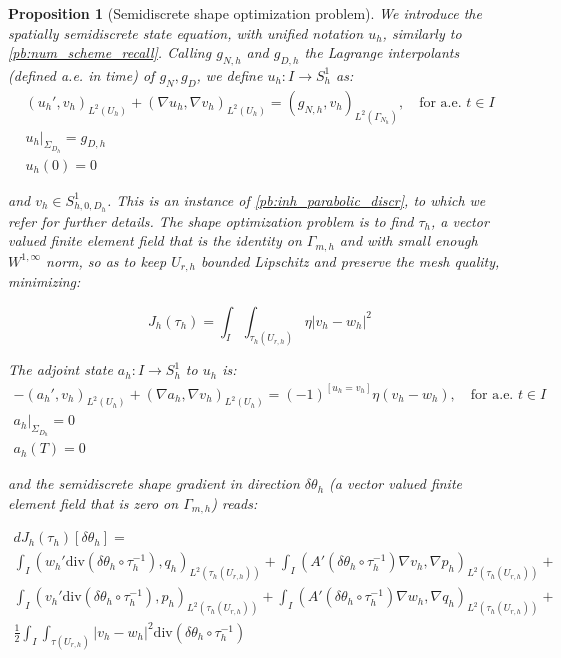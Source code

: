 \documentclass[english,a4paper,9pt,oneside]{scrbook}	%
\theoremstyle{break}
\newtheorem{prop}[equation]{Proposition}
\theoremstyle{remark}
\newcommand{\te}{\theta}
\newcommand{\dive}{\text{div}}
\begin{document}
\begin{prop}[Semidiscrete shape optimization problem]
\label{prop:sd_shopt}
We introduce the spatially semidiscrete state equation, with unified notation $u_h$, similarly to \cref{pb:num_scheme_recall}. Calling $g_{N,h}$ and $g_{D,h}$ the Lagrange interpolants (defined a.e. in time) of $g_N, g_D$, we define $u_h:I \rightarrow S^1_h$ as:
\begin{align*}
\left ( u_h', v_h\right)_{L^2(U_h)} + (\nabla u_h, \nabla v_h)_{L^2(U_h)} = (g_{N,h} , v_h)_{L^2(\Gamma_{N_h})}, \quad \text{for a.e. } t \in I\\
u_h|_{\Sigma_{D_h}}=g_{D,h}\\
u_h(0)=0
\end{align*}

and $v_h \in S^1_{h,0,D_h}$. This is an instance of \cref{pb:inh_parabolic_discr}, to which we refer for further details. The shape optimization problem is to find $\tau_h$, a vector valued finite element field that is the identity on $\Gamma_{m,h}$ and with small enough $W^{1,\infty}$ norm, so as to keep $U_{r,h}$ bounded Lipschitz and preserve the mesh quality, minimizing:

$$J_h(\tau_h)=\int_I\int_{\tau_h(U_{r,h})}\eta |v_h-w_h|^2$$

The adjoint state $a_h:I \rightarrow S^1_h$ to $u_h$ is:
\begin{align*}
-\left ( a_h', v_h\right)_{L^2(U_h)} + (\nabla a_h, \nabla v_h)_{L^2(U_h)} = (-1)^{\left [ u_h=v_h\right ]}\eta(v_h-w_h), \quad \text{for a.e. } t \in I\\
a_h|_{\Sigma_{D_h}}=0\\
a_h(T)=0
\end{align*}

and the semidiscrete shape gradient in direction $\delta \te_h$ (a vector valued finite element field that is zero on $\Gamma_{m,h}$) reads:

\begin{align*} 
	dJ_h(\tau_h)[\delta \te_h] =\\ \int_I (w_h' \dive(\delta \te_h\circ  \tau_h^{-1}), q_h )_{L^2(\tau_h(U_{r,h}))}+ \int_I (A'(\delta\te_h \circ \tau_h^{-1})\nabla v_h, \nabla p_h)_{L^2(\tau_h(U_{r,h}))}+\\
\int_I (v_h' \dive(\delta \te_h\circ  \tau_h^{-1}), p_h )_{L^2(\tau_h(U_{r,h}))}+ \int_I (A'(\delta\te_h \circ \tau_h^{-1})\nabla w_h, \nabla q_h)_{L^2(\tau_h(U_{r,h}))}+\\
\frac{1}{2}\int_I\int_{\tau(U_{r,h})}|v_h-w_h|^2\dive(\delta \te_h\circ  \tau_h^{-1})
\end{align*}

\end{prop}
\end{document}
